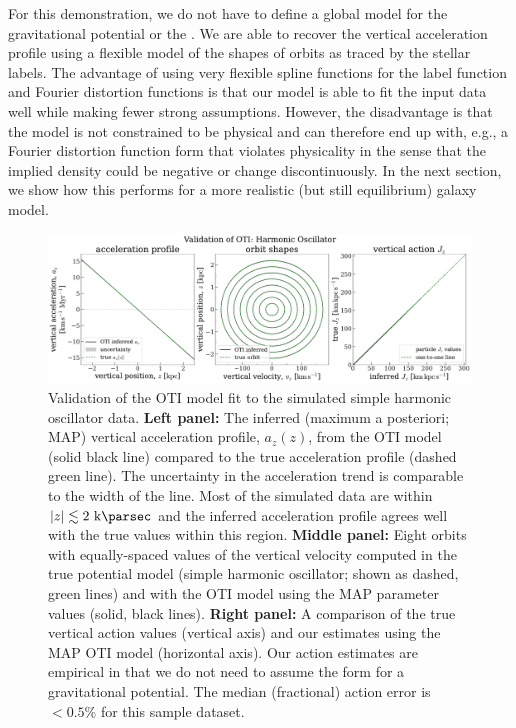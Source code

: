 For this demonstration, we do not have to define a global model for the gravitational
potential or the \df.
We are able to recover the vertical acceleration profile using a flexible model of the
shapes of orbits as traced by the stellar labels.
The advantage of using very flexible spline functions for the label function and Fourier
distortion functions is that our model is able to fit the input data well while making
fewer strong assumptions.
However, the disadvantage is that the model is not constrained to be physical and can
therefore end up with, e.g., a Fourier distortion function form that violates
physicality in the sense that the implied density could be negative or change
discontinuously.
In the next section, we show how this performs for a more realistic (but still
equilibrium) galaxy model.

\begin{figure}[t!]
\begin{center}
\includegraphics[width=\textwidth]{sho-validation.pdf}
\end{center}
\caption{%
Validation of the OTI model fit to the simulated simple harmonic oscillator data.
\textbf{Left panel:} The inferred (maximum a posteriori; MAP) vertical acceleration
profile, $a_z(z)$, from the OTI model (solid black line) compared to the true
acceleration profile (dashed green line).
The uncertainty in the acceleration trend is comparable to the width of the line.
Most of the simulated data are within $|z| \lesssim 2~\kpc$ and the inferred
acceleration profile agrees well with the true values within this region.
\textbf{Middle panel:} Eight orbits with equally-spaced values of the vertical velocity
computed in the true potential model (simple harmonic oscillator; shown as dashed, green
lines) and with the OTI model using the MAP parameter values (solid, black lines).
\textbf{Right panel:} A comparison of the true vertical action values (vertical axis)
and our estimates using the MAP OTI model (horizontal axis).
Our action estimates are empirical in that we do not need to assume the form for a
gravitational potential.
The median (fractional) action error is $<0.5\%$ for this sample dataset.
\label{fig:sho-validation}
}
\end{figure}

